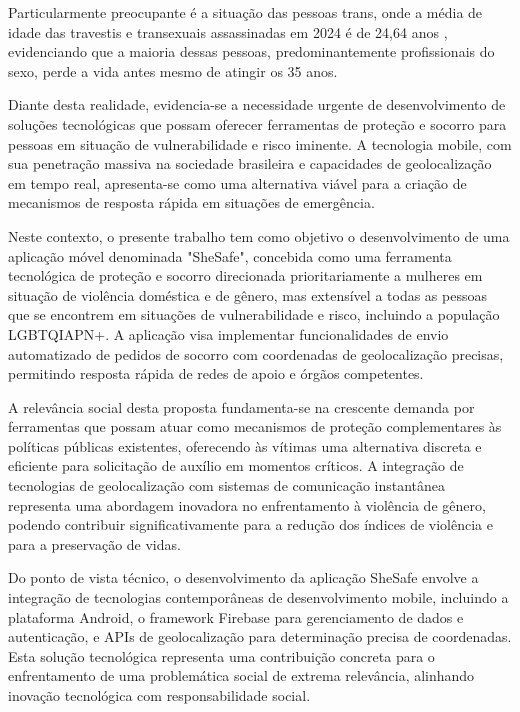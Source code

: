 Particularmente preocupante é a situação das pessoas trans, onde a média de idade das travestis e transexuais assassinadas em 2024 é de 24,64 anos \cite{antra2024dossiê}, evidenciando que a maioria dessas pessoas, predominantemente profissionais do sexo, perde a vida antes mesmo de atingir os 35 anos.

Diante desta realidade, evidencia-se a necessidade urgente de desenvolvimento de soluções tecnológicas que possam oferecer ferramentas de proteção e socorro para pessoas em situação de vulnerabilidade e risco iminente. A tecnologia mobile, com sua penetração massiva na sociedade brasileira e capacidades de geolocalização em tempo real, apresenta-se como uma alternativa viável para a criação de mecanismos de resposta rápida em situações de emergência.

Neste contexto, o presente trabalho tem como objetivo o desenvolvimento de uma aplicação móvel denominada "SheSafe", concebida como uma ferramenta tecnológica de proteção e socorro direcionada prioritariamente a mulheres em situação de violência doméstica e de gênero, mas extensível a todas as pessoas que se encontrem em situações de vulnerabilidade e risco, incluindo a população LGBTQIAPN+. A aplicação visa implementar funcionalidades de envio automatizado de pedidos de socorro com coordenadas de geolocalização precisas, permitindo resposta rápida de redes de apoio e órgãos competentes.

A relevância social desta proposta fundamenta-se na crescente demanda por ferramentas que possam atuar como mecanismos de proteção complementares às políticas públicas existentes, oferecendo às vítimas uma alternativa discreta e eficiente para solicitação de auxílio em momentos críticos. A integração de tecnologias de geolocalização com sistemas de comunicação instantânea representa uma abordagem inovadora no enfrentamento à violência de gênero, podendo contribuir significativamente para a redução dos índices de violência e para a preservação de vidas.

Do ponto de vista técnico, o desenvolvimento da aplicação SheSafe envolve a integração de tecnologias contemporâneas de desenvolvimento mobile, incluindo a plataforma Android, o framework Firebase para gerenciamento de dados e autenticação, e APIs de geolocalização para determinação precisa de coordenadas. Esta solução tecnológica representa uma contribuição concreta para o enfrentamento de uma problemática social de extrema relevância, alinhando inovação tecnológica com responsabilidade social.

